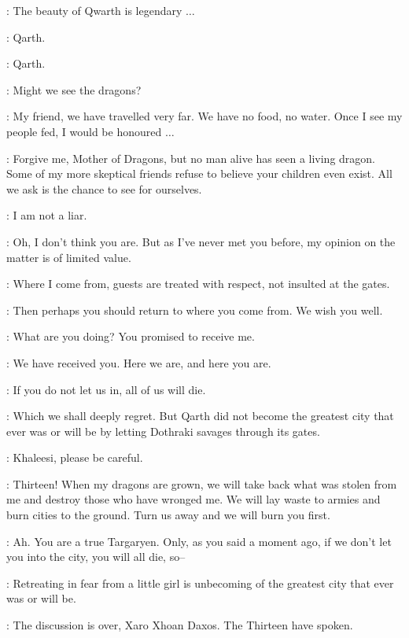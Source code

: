 \DAENERYS: The beauty of Qwarth is legendary $\ldots$  

\SPICEKING:  Qarth. 

\DAENERYS: Qarth. 

\SPICEKING: Might we see the dragons? 

\DAENERYS: My friend, we have travelled very far. We have no food, no water. Once I see my people fed, I would be honoured $\ldots$  

\SPICEKING: Forgive me, Mother of Dragons, but no man alive has seen a living dragon. Some of my more skeptical friends refuse to believe your children even exist. All we ask is the chance to see for ourselves. 

\DAENERYS: I am not a liar. 

\SPICEKING: Oh, I don't think you are. But as I've never met you before, my opinion on the matter is of limited value. 

\DAENERYS: Where I come from, guests are treated with respect, not insulted at the gates. 

\SPICEKING: Then perhaps you should return to where you come from. We wish you well. 


\DAENERYS: What are you doing? You promised to receive me. 

\SPICEKING: We have received you. Here we are, and here you are. 

\DAENERYS: If you do not let us in, all of us will die. 

\SPICEKING: Which we shall deeply regret. But Qarth did not become the greatest city that ever was or will be by letting Dothraki savages through its gates. 

\JORAH: Khaleesi, please be careful. 

\DAENERYS: Thirteen!  When my dragons are grown, we will take back what was stolen from me and destroy those who have wronged me. We will lay waste to armies and burn cities to the ground. Turn us away and we will burn you first. 

\SPICEKING: Ah. You are a true Targaryen. Only, as you said a moment ago, if we don't let you into the city, you will all die, so--

\XARO:  Retreating in fear from a little girl is unbecoming of the greatest city that ever was or will be.

\SPICEKING: The discussion is over, Xaro Xhoan Daxos. The Thirteen have spoken. 

